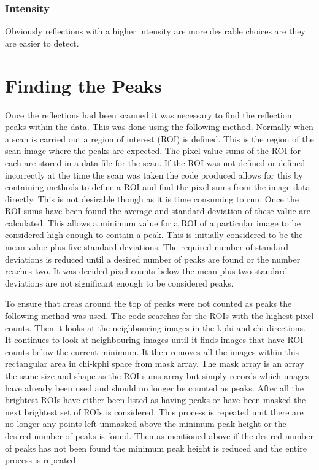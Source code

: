 \documentclass[10pt,a4paper]{article}
\begin{document}
\begin{multicols}{2}
\subsubsection*{Intensity}
Obviously reflections with a higher intensity are more desirable choices are they are easier to detect. 

\section*{Finding the Peaks}
Once the reflections had been scanned it was necessary to find the reflection peaks within the data. This was done using the following method. Normally when a scan is carried out a region of interest (ROI) is defined. This is the region of the scan image where the peaks are expected. The pixel value sums of the ROI for each are stored in a data file for the scan. If the ROI was not defined or defined incorrectly at the time the scan was taken the code produced allows for this by containing methods to define a ROI and find the pixel sums from the image data directly. This is not desirable though as it is time consuming to run. Once the ROI sums have been found the average and standard deviation of these value are calculated. This allows a minimum value for a ROI of a particular image to be considered high enough to contain a peak. This is initially considered to be the mean value plus five standard deviations. The required number of standard deviations is reduced until a desired number of peaks are found or the number reaches two. It was decided pixel counts below the mean plus two standard deviations are not significant enough to be considered peaks.

To ensure that areas around the top of peaks were not counted as peaks the following method was used. The code searches for the ROIs with the highest pixel counts. Then it looks at the neighbouring images in the kphi and chi directions. It continues to look at neighbouring images until it finds images that have ROI counts below the current minimum. It then removes all the images within this rectangular area in chi-kphi space from mask array. The mask array is an array the same size and shape as the ROI sums array but simply records which images have already been used and should no longer be counted as peaks. After all the brightest ROIs have either been listed as having peaks or have been masked the next brightest set of ROIs is considered. This process is repeated unit there are no longer any points left unmasked above the minimum peak height or the desired number of peaks is found. Then as mentioned above if the desired number of peaks has not been found the minimum peak height is reduced and the entire process is repeated.  


\end{multicols}
\end{document}
